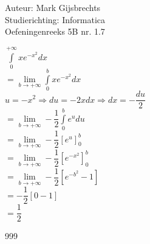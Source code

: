 \documentclass[a4paper]{article}
\newcommand{\dint}{\displaystyle\int}
\begin{document}
\noindent \large Auteur: Mark Gijsbrechts \\
\noindent \large Studierichting: Informatica\\
\noindent \large Oefeningenreeks 5B nr. 1.7\\

\medskip

\normalsize





$ \dint\limits_{0}^{+\infty} xe^{-x^2} dx $ \\

$= \lim\limits_{b \to +\infty} \dint\limits_{0}^{b} xe^{-x^2} dx  $ \\

$ u = -x^2 \Rightarrow du = -2x dx \Rightarrow dx = -\dfrac{du}{2}  $ \\

$= \lim\limits_{b \to +\infty} -\dfrac{1}{2} \dint\limits_{0}^{b} e^u du  $ \\

$= \lim\limits_{b \to +\infty} -\dfrac{1}{2}\left[ e^u \right]_{0}^{b}  $ \\

$= \lim\limits_{b \to +\infty} -\dfrac{1}{2}\left[ e^{-x^2} \right]_{0}^{b}  $ \\

$= \lim\limits_{b \to +\infty} -\dfrac{1}{2}\left[ e^{-b^2} - 1 \right]  $ \\

$= -\dfrac{1}{2}\left[ 0 - 1 \right]  $ \\

$= \dfrac{1}{2}  $ \\





\begin{thebibliography}{999}
\end{thebibliography}
\end{document}
